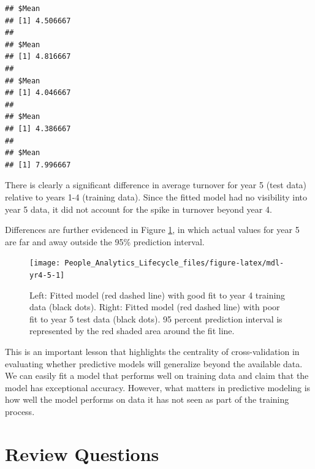 \documentclass[
]{book}
\begin{document}
\begin{verbatim}
## $Mean
## [1] 4.506667
## 
## $Mean
## [1] 4.816667
## 
## $Mean
## [1] 4.046667
## 
## $Mean
## [1] 4.386667
## 
## $Mean
## [1] 7.996667
\end{verbatim}

There is clearly a significant difference in average turnover for year 5 (test data) relative to years 1-4 (training data). Since the fitted model had no visibility into year 5 data, it did not account for the spike in turnover beyond year 4.

Differences are further evidenced in Figure \ref{fig:mdl-yr4-5}, in which actual values for year 5 are far and away outside the 95\% prediction interval.

\begin{figure}

{\centering \texttt{[image: People\_Analytics\_Lifecycle\_files/figure-latex/mdl-yr4-5-1]} 

}

\caption{Left: Fitted model (red dashed line) with good fit to year 4 training data (black dots). Right: Fitted model (red dashed line) with poor fit to year 5 test data (black dots). 95 percent prediction interval is represented by the red shaded area around the fit line.}\label{fig:mdl-yr4-5}
\end{figure}

This is an important lesson that highlights the centrality of cross-validation in evaluating whether predictive models will generalize beyond the available data. We can easily fit a model that performs well on training data and claim that the model has exceptional accuracy. However, what matters in predictive modeling is how well the model performs on data it has not seen as part of the training process.

\hypertarget{review-questions-10}{%
\section{Review Questions}\label{review-questions-10}}
\end{document}
